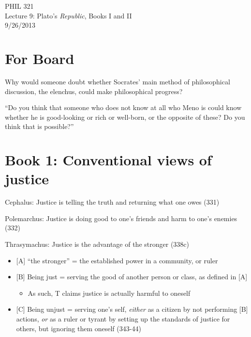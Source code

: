 \documentclass[11pt]{article}
\begin{document}
\thispagestyle{empty}
\begin{center} \LARGE{PHIL 321\\ Lecture 9: Plato's \emph{Republic}, Books I and II}\\ \vspace*{2mm}
\large{9/26/2013}\end{center}
\thispagestyle{empty}\vspace*{3mm}
\vspace*{-8mm}

\section*{For Board}

\noindent Why would someone doubt whether Socrates' main method of philosophical discussion, the elenchus, could make philosophical progress?
\vspace*{2mm}

\noindent ``Do you think that someone who does not know at all who Meno is could know whether he is good-looking or rich or well-born, or the opposite of these? Do you think that is possible?''

\section*{Book 1: Conventional views of justice}

\noindent Cephalus: Justice is telling the truth and returning what one owes (331)
\vspace*{2mm}

\noindent Polemarchus: Justice is doing good to one's friends and harm to one's enemies (332)
\vspace*{2mm}

\noindent Thrasymachus: Justice is the advantage of the stronger (338c)
\begin{itemize}\item{[A] ``the stronger'' = the established power in a community, or ruler}\item{[B] Being just = serving the good of another person or class, as defined in [A]}\begin{itemize}\item{As such, T claims justice is actually harmful to oneself}\end{itemize}\item{[C] Being unjust = serving one's self, \emph{either} as a citizen by not performing [B] actions, \emph{or} as a ruler or tyrant by setting up the standards of justice for others, but ignoring them oneself (343-44)}\end{itemize}
\end{document}
